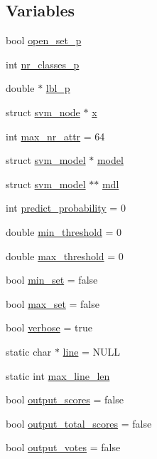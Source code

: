 \subsection*{Variables}
\begin{DoxyCompactItemize}
\item 
bool \hyperlink{svm-predict_8cpp_af292311da2955e8e2dd274443d57ee3a}{open\-\_\-set\-\_\-p}
\item 
int \hyperlink{svm-predict_8cpp_a7f5f60f72ac3c9c0dfe1c1873dff770f}{nr\-\_\-classes\-\_\-p}
\item 
double $\ast$ \hyperlink{svm-predict_8cpp_a34e7d19a381f7dfe28c6de7f93295bbc}{lbl\-\_\-p}
\item 
struct \hyperlink{structsvm__node}{svm\-\_\-node} $\ast$ \hyperlink{svm-predict_8cpp_a9a5b72a4065074cac5da07efb80a1e79}{x}
\item 
int \hyperlink{svm-predict_8cpp_af95bde9162db2c5dd97e80795b3548ed}{max\-\_\-nr\-\_\-attr} = 64
\item 
struct \hyperlink{structsvm__model}{svm\-\_\-model} $\ast$ \hyperlink{svm-predict_8cpp_a50c87b127b14787341e9630f4f5c700a}{model}
\item 
struct \hyperlink{structsvm__model}{svm\-\_\-model} $\ast$$\ast$ \hyperlink{svm-predict_8cpp_a639aa8f86cbf6b9c5d43e0c5082e26ac}{mdl}
\item 
int \hyperlink{svm-predict_8cpp_a1501132f5226b295e5300d74da55a2b9}{predict\-\_\-probability} = 0
\item 
double \hyperlink{svm-predict_8cpp_a3670388207cf8d0f4f4c9237a1482057}{min\-\_\-threshold} = 0
\item 
double \hyperlink{svm-predict_8cpp_a9090dc0b930a5f9212a3b6f3e4b5c5ab}{max\-\_\-threshold} = 0
\item 
bool \hyperlink{svm-predict_8cpp_aa816fb83dd1b415e1339bb8ddd6cdabc}{min\-\_\-set} = false
\item 
bool \hyperlink{svm-predict_8cpp_acd0f485f4131af58e0bdb273316d3805}{max\-\_\-set} = false
\item 
bool \hyperlink{svm-predict_8cpp_ab3f078684998b83967d507d0f453f454}{verbose} = true
\item 
static char $\ast$ \hyperlink{svm-predict_8cpp_a8adb30f4f6669f927fd9232f686c637b}{line} = N\-U\-L\-L
\item 
static int \hyperlink{svm-predict_8cpp_acad24c15bee67d2026f56bc94a1188c7}{max\-\_\-line\-\_\-len}
\item 
bool \hyperlink{svm-predict_8cpp_a7ce2b5cbc37a137a91ecc0cf035faba7}{output\-\_\-scores} = false
\item 
bool \hyperlink{svm-predict_8cpp_aa63d504586762ed1e2b057a76018d0fd}{output\-\_\-total\-\_\-scores} = false
\item 
bool \hyperlink{svm-predict_8cpp_ac3602f56435c68a322553ed33804e5d1}{output\-\_\-votes} = false
\end{DoxyCompactItemize}


